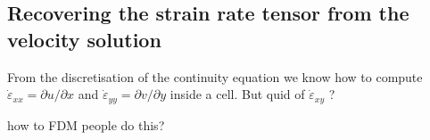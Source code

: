 \subsection{Recovering the strain rate tensor from the velocity solution}

From the discretisation of the continuity equation we know how to compute 
$\dot{\varepsilon}_{xx}=\partial u/ \partial x$ and
$\dot{\varepsilon}_{yy}=\partial v/ \partial y$ inside a cell. 
But quid of $\dot{\varepsilon}_{xy}$ ?

{\color{red} how to FDM people do this?}




























